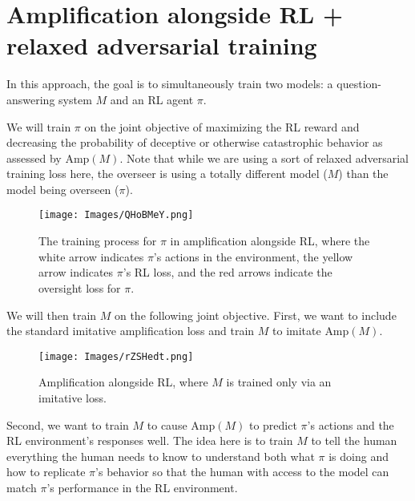 \documentclass[
  onecolumn,
  natbib,
]{miri-tech-article}
\begin{document}
\section{Amplification alongside RL + relaxed adversarial training}
\label{sec:11}

In this approach, the goal is to simultaneously train two models: a question-answering system $M$ and an RL agent $\pi$.

We will train $\pi$ on the joint objective of maximizing the RL reward and decreasing the probability of deceptive or otherwise catastrophic behavior as assessed by $\text{Amp}(M)$. Note that while we are using a sort of relaxed adversarial training loss here, the overseer is using a totally different model ($M$) than the model being overseen ($\pi$).

\vspace{4mm}

\begin{figure}[h!]
  \centering
  \texttt{[image: Images/QHoBMeY.png]}
  \caption{The training process for $\pi$ in amplification alongside RL, where the white arrow indicates $\pi$'s actions in the environment, the yellow arrow indicates $\pi$'s RL loss, and the red arrows indicate the oversight loss for $\pi$.}
\end{figure}

\vspace{2mm}

\noindent We will then train $M$ on the following joint objective. First, we want to include the standard imitative amplification loss and train $M$ to imitate $\text{Amp}(M)$.

\vspace{4mm}

\begin{figure}[H]
  \centering
  \texttt{[image: Images/rZSHedt.png]}
  \caption{Amplification alongside RL, where $M$ is trained only via an imitative loss.}
\end{figure}

\vspace{2mm}

\noindent Second, we want to train $M$ to cause $\text{Amp}(M)$ to predict $\pi$'s actions and the RL environment's responses well. The idea here is to train $M$ to tell the human everything the human needs to know to understand both what $\pi$ is doing and how to replicate $\pi$'s behavior so that the human with access to the model can match $\pi$'s performance in the RL environment.
\end{document}
